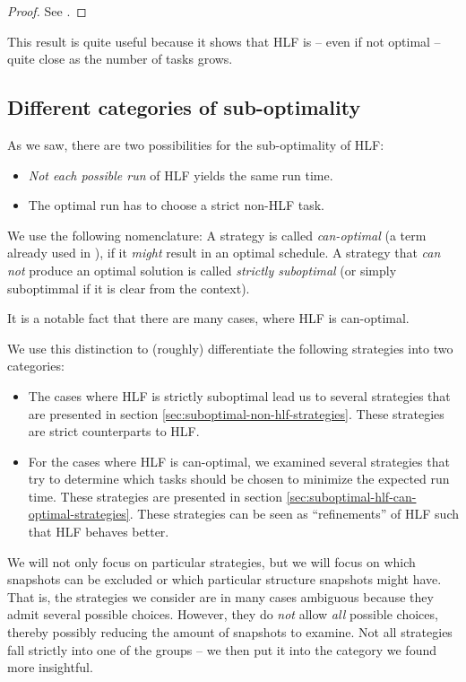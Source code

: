 \begin{proof}
  See \cite{journals/siamcomp/PapadimitriouT87}.
\end{proof}

This result is quite useful because it shows that HLF is -- even if not optimal -- quite close as the number of tasks grows.

\subsection{Different categories of sub-optimality}
\label{sec:hlf-suboptimal-two-variants}

As we saw, there are two possibilities for the sub-optimality of HLF:

\begin{itemize}
\item \emph{Not each possible run} of HLF yields the same run time.
\item The optimal run has to choose a strict non-HLF task.
\end{itemize}

We use the following nomenclature: A strategy is called \emph{can-optimal} (a term already used in \cite{MoritzMaasDiploma}), if it \emph{might} result in an optimal schedule. A strategy that \emph{can not} produce an optimal solution is called \emph{strictly suboptimal} (or simply suboptimmal if it is clear from the context). 

It is a notable fact that there are many cases, where HLF is can-optimal. 

We use this distinction to (roughly) differentiate the following strategies into two categories: 

\begin{itemize}
\item The cases where HLF is strictly suboptimal lead us to several strategies that are presented in section \ref{sec:suboptimal-non-hlf-strategies}. These strategies are strict counterparts to HLF.
\item For the cases where HLF is can-optimal, we examined several strategies that try to determine which tasks should be chosen to minimize the expected run time. These strategies are presented in section \ref{sec:suboptimal-hlf-can-optimal-strategies}. These strategies can be seen as ``refinements'' of HLF such that HLF behaves better.
\end{itemize}

We will not only focus on particular strategies, but we will focus on which snapshots can be excluded or which particular structure snapshots might have. That is, the strategies we consider are in many cases ambiguous because they admit several possible choices. However, they do \emph{not} allow \emph{all} possible choices, thereby possibly reducing the amount of snapshots to examine. Not all strategies fall strictly into one of the groups -- we then put it into the category we found more insightful.

